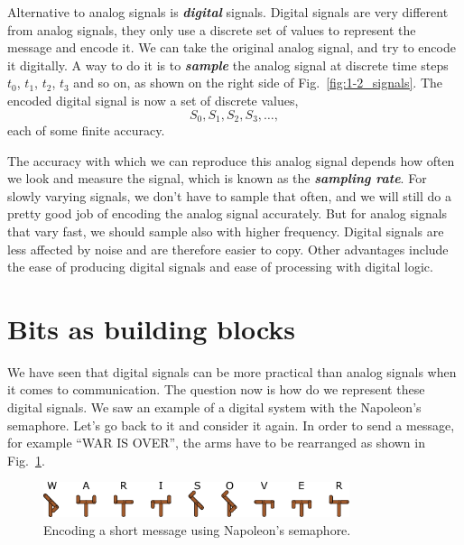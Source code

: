 Alternative to analog signals is \textit{\textbf{digital}} signals.
Digital signals are very different from analog signals, they only use a discrete set of values to represent the message and encode it.
We can take the original analog signal, and try to encode it digitally.
A way to do it is to \textit{\textbf{sample}} the analog signal at discrete time steps $t_0$, $t_1$, $t_2$, $t_3$ and so on, as shown on the right side of Fig.~\ref{fig:1-2_signals}.
The encoded digital signal is now a set of discrete values,
\begin{equation}
    S_0, S_1, S_2, S_3, \ldots,
\end{equation}
each of some finite accuracy.

The accuracy with which we can reproduce this analog signal depends how often we look and measure the signal, which is known as the \textit{\textbf{sampling rate}}.
For slowly varying signals, we don't have to sample that often, and we will still do a pretty good job of encoding the analog signal accurately.
But for analog signals that vary fast, we should sample also with higher frequency.
Digital signals are less affected by noise and are therefore easier to copy.
Other advantages include the ease of producing digital signals and ease of processing with digital logic.


\section{Bits as building blocks}


We have seen that digital signals can be more practical than analog signals when it comes to communication.
The question now is how do we represent these digital signals.
We saw an example of a digital system with the Napoleon's semaphore.
Let's go back to it and consider it again.
In order to send a message, for example ``WAR IS OVER'', the arms have to be rearranged as shown in Fig.~\ref{fig:1-3_warisover}.

\begin{figure}[t]
    \centering
    \includegraphics[width=0.8\textwidth]{lesson1/1-3_warisover.pdf}
    \caption[Message with Napoleon's semaphore]{Encoding a short message using Napoleon's semaphore.}
    \label{fig:1-3_warisover}
\end{figure}

